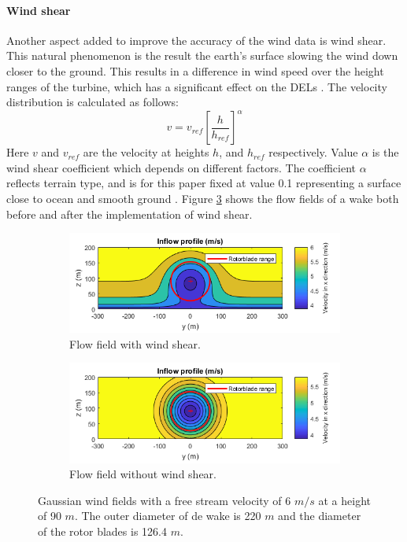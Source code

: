 \paragraph{Wind shear} \label{sec:windshear}
Another aspect added to improve the accuracy of the wind data is wind shear. This natural phenomenon is the result the earth's surface slowing the wind down closer to the ground. This results in a difference in wind speed over the height ranges of the turbine, which has a significant effect on the DELs \cite{Firtin2011}.  The velocity distribution is calculated as follows: 
\begin{equation}
\label{eq:shear}
v = v_{ref} \left[\frac{h}{h_{ref}}\right]^\alpha
\end{equation}
Here $v$ and $v_{ref}$ are the velocity at heights $h$, and $h_{ref}$  respectively. Value $\alpha$ is the wind shear coefficient which depends on different factors. The coefficient $\alpha$  reflects terrain type, and is for this paper fixed at value 0.1 representing a surface close to ocean and smooth ground \cite{Firtin2011}. Figure \ref{fig:windshear} shows the flow fields of a wake both before and after the implementation of wind shear.

\begin{figure}
	\centering
	\begin{subfigure}[b]{0.50\textwidth}
		\includegraphics[width=\linewidth]{./Figures/PlotwithshearU6D220.png} %
		\caption{Flow field with wind shear.}
		\label{fig:windsh}
	\end{subfigure}
	
	\begin{subfigure}[b]{0.50\textwidth}
		\includegraphics[width=\linewidth]{./Figures/PlotwithoutshearU6D220.png} %
		\caption{Flow field without wind shear.}
		\label{fig:nowindsh}
	\end{subfigure}
	
	\caption[Two Gaussian flow fields]{Gaussian wind fields with a free stream velocity of 6 $m/s$ at a height of 90 $m$. The outer diameter of de wake is 220 $m$ and the diameter of the rotor blades is 126.4 $m$.}
	\label{fig:windshear}
\end{figure}





